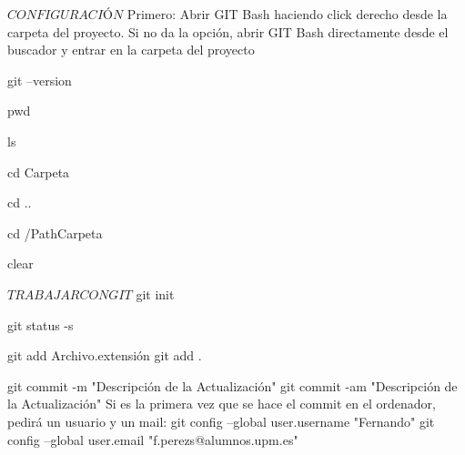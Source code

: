 
$ CONFIGURACIÓN $
Primero: Abrir GIT Bash haciendo click derecho desde la carpeta del proyecto. Si no da la opción, abrir GIT Bash directamente desde el buscador y entrar en la carpeta del proyecto

	git --version		%

	pwd					%

	ls					%

	cd Carpeta			%

	cd ..				%

	cd /PathCarpeta		%

	clear				%



$ TRABAJAR CON GIT $
	git init		%

	git status -s	%

	git add Archivo.extensión	%
	git add .					%

	git commit -m "Descripción de la Actualización"		%
	git commit -am "Descripción de la Actualización"	%
		Si es la primera vez que se hace el commit en el ordenador, pedirá un usuario y un mail:
			git config --global user.username "Fernando"
			git config --global user.email "f.perezs@alumnos.upm.es"

